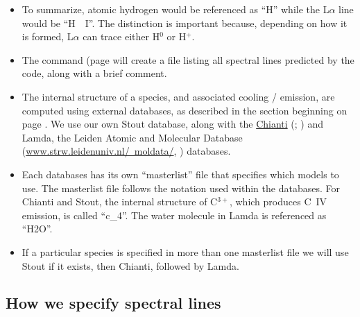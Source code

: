 \begin{itemize}
\item
To summarize, atomic hydrogen would be referenced as ``H'' while the L$\alpha$
line would be ``H~~I''.  The distinction is important because,
depending on how it is formed, L$\alpha$ can trace either
H$^0$ or H$^+$.

\item  The  command
(page \pageref{sec:SaveLineLabels} will create a file
listing all spectral lines predicted by the code, along with a brief comment.
  
 \item
 The internal structure of a species, and associated cooling / emission, are computed
 using external databases, as described in the section beginning on
 page \pageref{sec:ControllingAtomicModels}.
 We use our own Stout database, along with the 
\href{http://www.chiantidatabase.org/}{Chianti}  
(\cite{Dere.K97CHIANTI---an-atomic-database-for-emission}; \cite{Landi2012})
and Lamda, the Leiden Atomic and Molecular
Database (\href{http://www.strw.leidenuniv.nl/~moldata/}{www.strw.leidenuniv.nl/~moldata/}, 
\citet{Schoier.F05An-atomic-and-molecular-database-for-analysis}) databases.

\item
Each databases has its own ``masterlist'' file that
specifies which models to use.
The masterlist file follows the notation used within the databases.
For Chianti and Stout, the internal structure of C$^{3+}$, which produces C~IV emission,
is called ``c\_4''.
The water molecule in Lamda is referenced as ``H2O''.

\item
If a particular species is specified in more than one masterlist file we will
use Stout if it exists, then Chianti, followed by Lamda.  

 \end{itemize}

\subsection{How we specify spectral lines}
\label{sec:SpecifySpectralLines}

